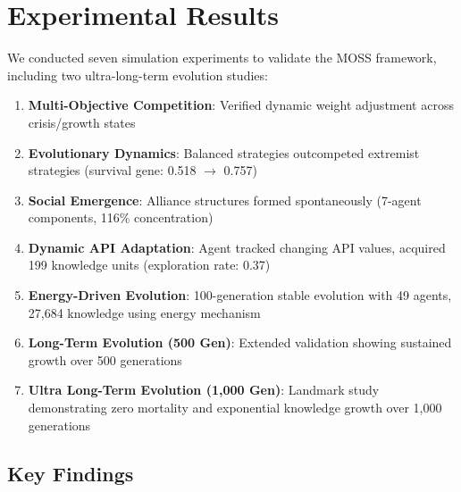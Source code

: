 \documentclass[10pt,a4paper]{article}
\begin{document}
\section{Experimental Results}

We conducted seven simulation experiments to validate the MOSS framework, including two ultra-long-term evolution studies:

\begin{enumerate}
    \item \textbf{Multi-Objective Competition}: Verified dynamic weight adjustment across crisis/growth states
    \item \textbf{Evolutionary Dynamics}: Balanced strategies outcompeted extremist strategies (survival gene: 0.518 $\rightarrow$ 0.757)
    \item \textbf{Social Emergence}: Alliance structures formed spontaneously (7-agent components, 116\% concentration)
    \item \textbf{Dynamic API Adaptation}: Agent tracked changing API values, acquired 199 knowledge units (exploration rate: 0.37)
    \item \textbf{Energy-Driven Evolution}: 100-generation stable evolution with 49 agents, 27,684 knowledge using energy mechanism
    \item \textbf{Long-Term Evolution (500 Gen)}: Extended validation showing sustained growth over 500 generations
    \item \textbf{Ultra Long-Term Evolution (1,000 Gen)}: Landmark study demonstrating zero mortality and exponential knowledge growth over 1,000 generations
\end{enumerate}

\subsection{Key Findings}
\end{document}
